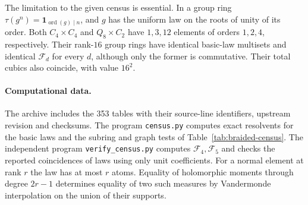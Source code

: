 \documentclass[11pt,reqno]{amsart}
\theoremstyle{definition}
\begin{document}
The limitation to the given census is essential. In a group ring $\tau(g^n)=\mathbf1_{\operatorname{ord}(g)\mid n}$, and $g$ has the uniform law on the roots of unity of its order. Both $C_4\times C_4$ and $Q_8\times C_2$ have $1,3,12$ elements of orders $1,2,4$, respectively. Their rank-$16$ group rings have identical basic-law multisets and identical $\mathcal F_d$ for every $d$, although only the former is commutative. Their total cubics also coincide, with value $16^2$.

\paragraph{Computational data.}
The archive includes the 353 tables with their source-line identifiers, upstream revision and checksums. The program \texttt{census.py} computes exact resolvents for the basic laws and the subring and graph tests of Table~\ref{tab:braided-census}. The independent program \texttt{verify\_census.py} computes $\mathcal F_4,\mathcal F_5$ and checks the reported coincidences of laws using only unit coefficients. For a normal element at rank $r$ the law has at most $r$ atoms. Equality of holomorphic moments through degree $2r-1$ determines equality of two such measures by Vandermonde interpolation on the union of their supports.
\end{document}
